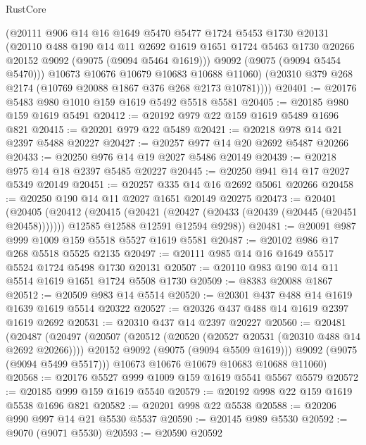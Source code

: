 \begin{lexlean}{RustCore}
\begin{coremodule}
          (@20111
            @906
            @14
            @16
            @1649
            @5470
            @5477
            @1724
            @5453
            @1730
            @20131
            (@20110
              @488
              @190
              @14
              @11
              @2692
              @1619
              @1651
              @1724
              @5463
              @1730
              @20266
              @20152
              @9092
              (@9075 (@9094 @5464 @1619)))
            @9092
            (@9075 (@9094 @5454 @5470)))
          @10673
          @10676
          @10679
          @10683
          @10688
          @11060)
        (@20310 @379 @268 @2174 (@10769 @20088 @1867 @376 @268 @2173 @10781))))
@20401 := @20176 @5483 @980 @1010 @159 @1619 @5492 @5518 @5581
@20405 := @20185 @980 @159 @1619 @5491
@20412 := @20192 @979 @22 @159 @1619 @5489 @1696 @821
@20415 := @20201 @979 @22 @5489
@20421 := @20218 @978 @14 @21 @2397 @5488 @20227
@20427 := @20257 @977 @14 @20 @2692 @5487 @20266
@20433 := @20250 @976 @14 @19 @2027 @5486 @20149
@20439 := @20218 @975 @14 @18 @2397 @5485 @20227
@20445 := @20250 @941 @14 @17 @2027 @5349 @20149
@20451 := @20257 @335 @14 @16 @2692 @5061 @20266
@20458 := @20250 @190 @14 @11 @2027 @1651 @20149 @20275
@20473 := @20401
    (@20405
      (@20412
        (@20415 (@20421 (@20427 (@20433 (@20439 (@20445 (@20451 @20458)))))))
        @12585
        @12588
        @12591
        @12594
        @9298))
@20481 := @20091 @987 @999 @1009 @159 @5518 @5527 @1619 @5581
@20487 := @20102 @986 @17 @268 @5518 @5525 @2135
@20497 := @20111 @985 @14 @16 @1649 @5517 @5524 @1724 @5498 @1730 @20131
@20507 := @20110 @983 @190 @14 @11 @5514 @1619 @1651 @1724 @5508 @1730
@20509 := @8383 @20088 @1867
@20512 := @20509 @983 @14 @5514
@20520 := @20301 @437 @488 @14 @1619 @1639 @1619 @5514 @20322
@20527 := @20326 @437 @488 @14 @1619 @2397 @1619 @2692
@20531 := @20310 @437 @14 @2397 @20227
@20560 := @20481
    (@20487
      (@20497
        (@20507
          (@20512 (@20520 (@20527 @20531 (@20310 @488 @14 @2692 @20266))))
          @20152
          @9092
          (@9075 (@9094 @5509 @1619)))
        @9092
        (@9075 (@9094 @5499 @5517)))
      @10673
      @10676
      @10679
      @10683
      @10688
      @11060)
@20568 := @20176 @5527 @999 @1009 @159 @1619 @5541 @5567 @5579
@20572 := @20185 @999 @159 @1619 @5540
@20579 := @20192 @998 @22 @159 @1619 @5538 @1696 @821
@20582 := @20201 @998 @22 @5538
@20588 := @20206 @990 @997 @14 @21 @5530 @5537
@20590 := @20145 @989 @5530
@20592 := @9070 (@9071 @5530)
@20593 := @20590 @20592

\end{coremodule}
\end{lexlean}
